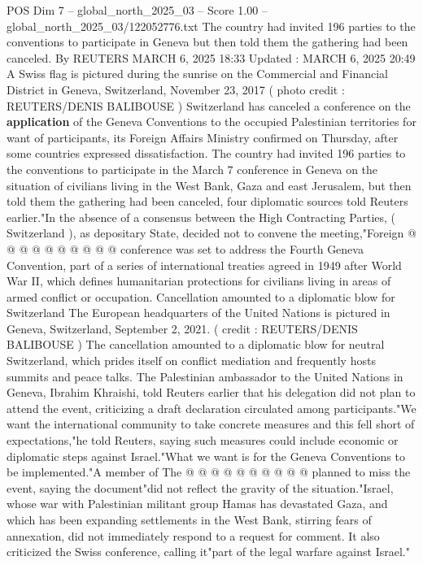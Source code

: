 \begin{textsample}{POS Dim 7 – global\_north\_2025\_03 – Score 1.00 – global\_north\_2025\_03/122052776.txt}  \label{ex:f7_pos_325}
The country had invited 196 parties to the conventions to participate in Geneva but then told them the gathering had been canceled.
By REUTERS MARCH 6, 2025 18:33 Updated : MARCH 6, 2025 20:49 A Swiss flag is pictured during the sunrise on the Commercial and Financial District in Geneva, Switzerland, November 23, 2017 ( photo credit : REUTERS/DENIS BALIBOUSE ) Switzerland has canceled a conference on the \textbf{application} of the Geneva Conventions to the occupied Palestinian territories for want of participants, its Foreign Affairs Ministry confirmed on Thursday, after some countries expressed dissatisfaction.
The country had invited 196 parties to the conventions to participate in the March 7 conference in Geneva on the situation of civilians living in the West Bank, Gaza and east Jerusalem, but then told them the gathering had been canceled, four diplomatic sources told Reuters earlier."In the absence of a consensus between the High Contracting Parties, ( Switzerland ), as depositary State, decided not to convene the meeting,"Foreign @ @ @ @ @ @ @ @ @ @ conference was set to address the Fourth Geneva Convention, part of a series of international treaties agreed in 1949 after World War II, which defines humanitarian protections for civilians living in areas of armed conflict or occupation.
Cancellation amounted to a diplomatic blow for Switzerland The European headquarters of the United Nations is pictured in Geneva, Switzerland, September 2, 2021. ( credit : REUTERS/DENIS BALIBOUSE ) The cancellation amounted to a diplomatic blow for neutral Switzerland, which prides itself on conflict mediation and frequently hosts summits and peace talks.
The Palestinian ambassador to the United Nations in Geneva, Ibrahim Khraishi, told Reuters earlier that his delegation did not plan to attend the event, criticizing a draft declaration circulated among participants."We want the international community to take concrete measures and this fell short of expectations,"he told Reuters, saying such measures could include economic or diplomatic steps against Israel."What we want is for the Geneva Conventions to be implemented."A member of The @ @ @ @ @ @ @ @ @ @ planned to miss the event, saying the document"did not reflect the gravity of the situation."Israel, whose war with Palestinian militant group Hamas has devastated Gaza, and which has been expanding settlements in the West Bank, stirring fears of annexation, did not immediately respond to a request for comment.
It also criticized the Swiss conference, calling it"part of the legal warfare against Israel."

\end{textsample}
